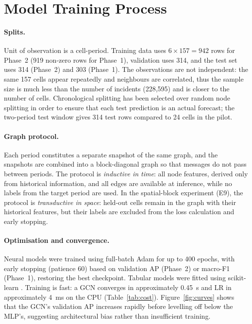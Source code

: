 \documentclass[11pt,a4paper]{report}
\begin{document}
\section{Model Training Process}
\paragraph{Splits.} Unit of observation is a cell-period. Training data uses $6\times157=942$ rows for Phase~2 (919 non-zero rows for Phase~1), validation uses 314, and the test set uses 314 (Phase~2) and 303 (Phase~1). The observations are not independent: the same 157 cells appear repeatedly and neighbours are correlated, thus the sample size is much less than the number of incidents (228,595) and is closer to the number of cells. Chronological splitting has been selected over random node splitting in order to ensure that each test prediction is an actual forecast; the two-period test window gives 314 test rows compared to 24 cells in the pilot.

\paragraph{Graph protocol.} Each period constitutes a separate snapshot of the same graph, and the snapshots are combined into a block-diagonal graph so that messages do not pass between periods. The protocol is \emph{inductive in time}: all node features, derived only from historical information, and all edges are available at inference, while no labels from the target period are used. In the spatial-block experiment (E9), the protocol is \emph{transductive in space}: held-out cells remain in the graph with their historical features, but their labels are excluded from the loss calculation and early stopping.


\paragraph{Optimisation and convergence.} Neural models were trained using full-batch Adam for up to 400 epochs, with early stopping (patience 60) based on validation AP (Phase~2) or macro-F1 (Phase~1), restoring the best checkpoint. Tabular models were fitted using scikit-learn \citep{pedregosa2011}. Training is fast: a GCN converges in approximately 0.45~s and LR in approximately 4~ms on the CPU (Table~\ref{tab:cost}). Figure~\ref{fig:curves} shows that the GCN's validation AP increases rapidly before levelling off below the MLP's, suggesting architectural bias rather than insufficient training.
\end{document}

